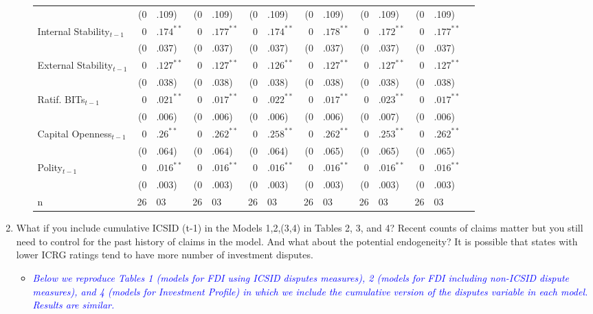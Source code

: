 \begin{enumerate}
\begin{itemize}
\begin{table}[ht]
\begin{tabular}{lr@{} lr@{}lr@{}lr@{} lr@{}lr@{}lr@{}}
			   & (0&.109) & (0&.109) & (0&.109) & (0&.109) & (0&.109) & (0&.109) \\ 
			  Internal Stability$_{t-1}$ & $0$&$.174^{\ast\ast}$ & $0$&$.177^{\ast\ast}$ & $0$&$.174^{\ast\ast}$ & $0$&$.178^{\ast\ast}$ & $0$&$.172^{\ast\ast}$ & $0$&$.177^{\ast\ast}$ \\ 
			   & (0&.037) & (0&.037) & (0&.037) & (0&.037) & (0&.037) & (0&.037) \\ 
			  External Stability$_{t-1}$ & $0$&$.127^{\ast\ast}$ & $0$&$.127^{\ast\ast}$ & $0$&$.126^{\ast\ast}$ & $0$&$.127^{\ast\ast}$ & $0$&$.127^{\ast\ast}$ & $0$&$.127^{\ast\ast}$ \\ 
			   & (0&.038) & (0&.038) & (0&.038) & (0&.038) & (0&.038) & (0&.038) \\ 
			  Ratif. BITs$_{t-1}$ & $0$&$.021^{\ast\ast}$ & $0$&$.017^{\ast\ast}$ & $0$&$.022^{\ast\ast}$ & $0$&$.017^{\ast\ast}$ & $0$&$.023^{\ast\ast}$ & $0$&$.017^{\ast\ast}$ \\ 
			   & (0&.006) & (0&.006) & (0&.006) & (0&.006) & (0&.007) & (0&.006) \\ 
			  Capital Openness$_{t-1}$ & $0$&$.26^{\ast\ast}$ & $0$&$.262^{\ast\ast}$ & $0$&$.258^{\ast\ast}$ & $0$&$.262^{\ast\ast}$ & $0$&$.253^{\ast\ast}$ & $0$&$.262^{\ast\ast}$ \\ 
			   & (0&.064) & (0&.064) & (0&.064) & (0&.065) & (0&.065) & (0&.065) \\ 
			  Polity$_{t-1}$ & $0$&$.016^{\ast\ast}$ & $0$&$.016^{\ast\ast}$ & $0$&$.016^{\ast\ast}$ & $0$&$.016^{\ast\ast}$ & $0$&$.016^{\ast\ast}$ & $0$&$.016^{\ast\ast}$ \\ 
			   & (0&.003) & (0&.003) & (0&.003) & (0&.003) & (0&.003) & (0&.003) \\ 
			   \hline
			n & 26&03 & 26&03 & 26&03 & 26&03 & 26&03 & 26&03 \\ 
			   \hline
			\hline
			\end{tabular}
			\endgroup
			\end{table}
			\FloatBarrier

	\end{itemize}
	\clearpage
	\item What if you include cumulative ICSID (t-1) in the Models 1,2,(3,4) in Tables 2, 3, and 4? Recent counts of claims matter but you still need to control for the past history of claims in the model. And what about the potential endogeneity? It is possible that states with lower ICRG ratings tend to have more number of investment disputes.		
	\begin{itemize}
		\item \textcolor{blue}{ \emph{ Below we reproduce Tables 1 (models for FDI using ICSID disputes measures), 2 (models for FDI including non-ICSID dispute measures), and 4 (models for Investment Profile) in which we include the cumulative version of the disputes variable in each model. Results are similar.}}


\end{itemize}
\end{enumerate}
